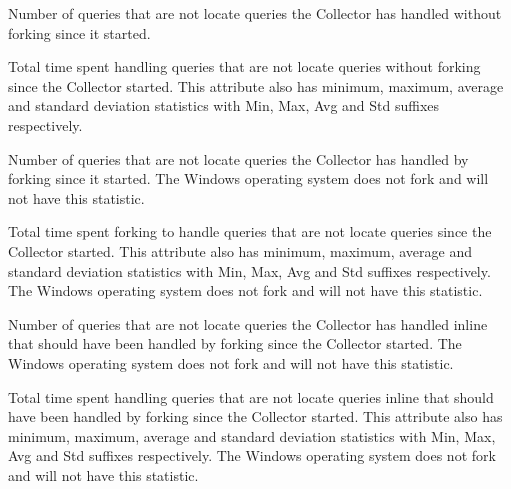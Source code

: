 \begin{description}
\item[\AdAttr{HandleQuery}:] Number of queries that are not locate queries the Collector has handled without forking since it started.

\item[\AdAttr{HandleQueryRuntime}:] Total time spent handling queries that are not locate queries without forking since the Collector started.
This attribute also has minimum, maximum, average and standard deviation statistics with Min, Max, Avg and Std suffixes respectively.

\item[\AdAttr{HandleQueryForked}:] Number of queries that are not locate queries the Collector has handled by forking since it started.
The Windows operating system does not fork and will not have this statistic.

\item[\AdAttr{HandleQueryForkedRuntime}:] Total time spent forking to handle queries that are not locate queries since the Collector started.
This attribute also has minimum, maximum, average and standard deviation statistics with Min, Max, Avg and Std suffixes respectively.
The Windows operating system does not fork and will not have this statistic.

\item[\AdAttr{HandleQueryMissedFork}:] Number of queries that are not locate queries the Collector has handled inline that should have been handled by forking since the Collector started.
The Windows operating system does not fork and will not have this statistic.

\item[\AdAttr{HandleQueryMissedForkRuntime}:] Total time spent handling queries that are not locate queries inline that should have been handled by forking since the Collector started.
This attribute also has minimum, maximum, average and standard deviation statistics with Min, Max, Avg and Std suffixes respectively.
The Windows operating system does not fork and will not have this statistic.


\end{description}
